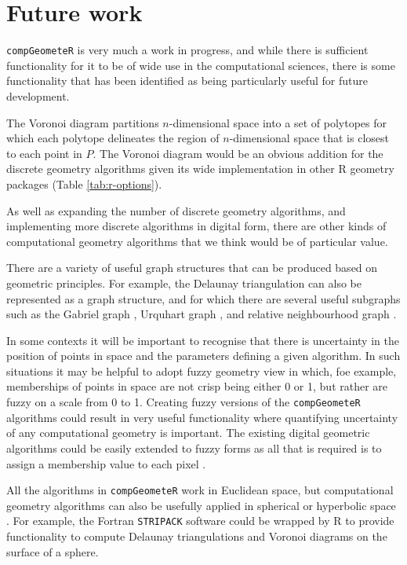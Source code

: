 \documentclass[12pt, a4paper]{article}
\begin{document}
\section{Future work}

\texttt{compGeometeR} is very much a work in progress, and while there is sufficient functionality for it to be of wide use in the computational sciences, there is some functionality that has been identified as being particularly useful for future development.

The Voronoi diagram \citep{voronoi-1908, okabe-2000} partitions $n$-dimensional space into a set of polytopes for which each polytope delineates the region of $n$-dimensional space that is closest to each point in $P$.  The Voronoi diagram would be an obvious addition for the discrete geometry algorithms given its wide implementation in other R geometry packages (Table \ref{tab:r-options}).

As well as expanding the number of discrete geometry algorithms, and implementing more discrete algorithms in digital form, there are other kinds of computational geometry algorithms that we think would be of particular value.

There are a variety of useful graph structures that can be produced based on geometric principles.  For example, the Delaunay triangulation \citep{delaunay-1934} can also be represented as a graph structure, and for which there are several useful subgraphs such as the Gabriel graph \citep{gabriel-1969}, Urquhart graph \citep{urquhart-1980}, and relative neighbourhood graph \citep{toussaint-1980}.

In some contexts it will be important to recognise that there is uncertainty in the position of points in space and the parameters defining a given algorithm.  In such situations it may be helpful to adopt fuzzy geometry \citep{rosenfeld-1998} view in which, foe example, memberships of points in space are not crisp being either 0 or 1, but rather are fuzzy on a scale from 0 to 1.  Creating fuzzy versions of the \texttt{compGeometeR} algorithms could result in very useful functionality where quantifying uncertainty of any computational geometry is important.  The existing digital geometric algorithms could be easily extended to fuzzy forms as all that is required is to assign a membership value to each pixel \citep{klette-2004}.

All the algorithms in \texttt{compGeometeR} work in Euclidean space, but computational geometry algorithms can also be usefully applied in spherical or hyperbolic space \citep{gowers-2003}.  For example, the Fortran \texttt{STRIPACK} software \citep{renka-1997} could be wrapped by R to provide functionality to compute Delaunay triangulations and Voronoi diagrams on the surface of a sphere.
\end{document}
